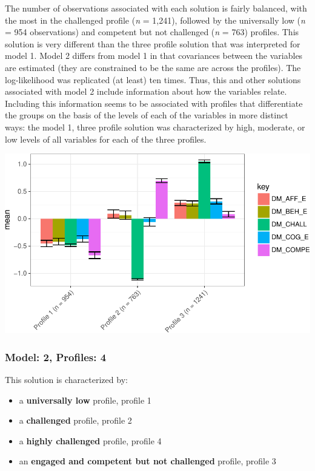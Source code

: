 \documentclass[]{book}
\providecommand{\tightlist}{%
  \setlength{\itemsep}{0pt}\setlength{\parskip}{0pt}}
\theoremstyle{definition}
\theoremstyle{definition}
\theoremstyle{definition}
\theoremstyle{remark}
\begin{document}
The number of observations associated with each solution is fairly
balanced, with the most in the challenged profile (\emph{n} = 1,241),
followed by the universally low (\emph{n} = 954 observations) and
competent but not challenged (\emph{n} = 763) profiles. This solution is
very different than the three profile solution that was interpreted for
model 1. Model 2 differs from model 1 in that covariances between the
variables are estimated (they are constrained to be the same are across
the profiles). The log-likelihood was replicated (at least) ten times.
Thus, this and other solutions associated with model 2 include
information about how the variables relate. Including this information
seems to be associated with profiles that differentiate the groups on
the basis of the levels of each of the variables in more distinct ways:
the model 1, three profile solution was characterized by high, moderate,
or low levels of all variables for each of the three profiles.

\begin{center}\includegraphics[width=0.8\linewidth]{rosenberg-dissertation_files/figure-latex/m2_3p-1} \end{center}

\subsubsection{Model: 2, Profiles: 4}\label{model-2-profiles-4}

This solution is characterized by:

\begin{itemize}
\tightlist
\item
  a \textbf{universally low} profile, profile 1
\item
  a \textbf{challenged} profile, profile 2
\item
  a \textbf{highly challenged} profile, profile 4
\item
  an \textbf{engaged and competent but not challenged} profile, profile
  3
\end{itemize}
\end{document}
